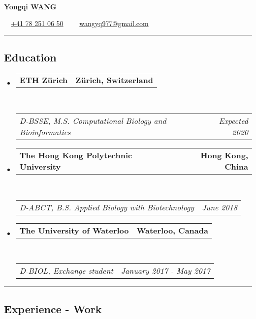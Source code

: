 \documentclass[10pt,letterpaper]{article}
\makeatletter
\newcommand{\headerrow}[2]
{\begin{tabular*}{\linewidth}{l@{\extracolsep{\fill}}r}
	#1 &
	#2 \\
\end{tabular*}}
\makeatother
\begin{document}

\begin{center}
{\LARGE \textbf{Yongqi WANG}}

\textbullet \ \ \href{tel:410782510650}{+41 78 251 06 50} \ \
\textbullet \ \ \href{mailto:wangyq977@gmail.com}{wangyq977@gmail.com}
\end{center}



\hrule
\vspace{-1em}
\subsection*{Education}

\begin{itemize}
	\parskip=0.1em

	\item
	\headerrow
		{\textbf{ETH Zürich}}
		{\textbf{Zürich, Switzerland}}
	\\
	\headerrow
		{\emph{D-BSSE, M.S. Computational Biology and Bioinformatics}}
		{\emph{Expected 2020}}

	\item
	\headerrow
		{\textbf{The Hong Kong Polytechnic University}}
		{\textbf{Hong Kong, China}}
	\\
	\headerrow
		{\emph{D-ABCT, B.S. Applied Biology with Biotechnology}}
		{\emph{June 2018}}

	\item
	\headerrow
		{\textbf{The University of Waterloo}}
		{\textbf{Waterloo, Canada}}
	\\
	\headerrow
		{\emph{D-BIOL, Exchange student}}
		{\emph{January 2017 - May 2017}}

\end{itemize}



\hrule
\vspace{-1em}
\subsection*{Experience - Work}
\end{document}
